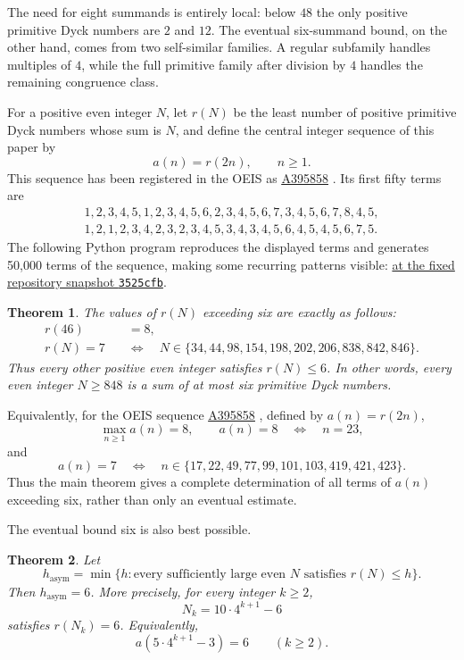 \documentclass[12pt]{article}
\theoremstyle{plain}
\newtheorem{theorem}{Theorem}
\theoremstyle{definition}
\theoremstyle{plain}
\newcommand{\seqnum}[1]{\href{https://oeis.org/#1}{\rm \underline{#1}}}
\begin{document}
The need for eight summands is entirely local: below $48$ the only
positive primitive Dyck numbers are $2$ and $12$.  The eventual
six-summand bound, on the other hand, comes from two self-similar
families.  A regular subfamily handles multiples of $4$, while the full
primitive family after division by $4$ handles the remaining congruence
class.

For a positive even integer $N$, let $r(N)$ be the least number of
positive primitive Dyck numbers whose sum is $N$, and define the central
integer sequence of this paper by
\[
        a(n)=r(2n),\qquad n\geq1.
\]
This sequence has been registered in the OEIS as
\seqnum{A395858} \cite{OEIS-A395858}.  Its first fifty terms are
\[
\begin{gathered}
1,2,3,4,5,1,2,3,4,5,6,2,3,4,5,6,7,3,4,5,6,7,8,4,5,\\
1,2,1,2,3,4,2,3,2,3,4,5,3,4,3,4,5,6,4,5,4,5,6,7,5.
\end{gathered}
\]
The following Python program reproduces the displayed terms and generates
50,000 terms of the sequence, making some recurring patterns visible:
\href{https://github.com/growupkuriyama-hub/lean_cfg_project/blob/3525cfb/LeanCfgProject/PrimDyck/A395858.py}{ at the fixed repository snapshot \texttt{3525cfb}}.

\begin{theorem}\label{thm:classification}
The values of $r(N)$ exceeding six are exactly as follows:
\[
\begin{aligned}
 r(46)&=8,\\[4pt]
 r(N)=7\quad&\Longleftrightarrow\quad
 N\in\{34,44,98,154,198,202,206,838,842,846\}.
\end{aligned}
\]
Thus every other positive even integer satisfies $r(N)\leq6$.  In other
words, every even integer $N\geq848$ is a sum of at most six primitive
Dyck numbers.
\end{theorem}

Equivalently, for the OEIS sequence \seqnum{A395858}
\cite{OEIS-A395858}, defined by $a(n)=r(2n)$,
\[
        \max_{n\geq1}a(n)=8,
        \qquad
        a(n)=8\quad\Longleftrightarrow\quad n=23,
\]
and
\[
 a(n)=7
 \quad\Longleftrightarrow\quad
 n\in\{17,22,49,77,99,101,103,419,421,423\}.
\]
Thus the main theorem gives a complete determination of all terms of
$a(n)$ exceeding six, rather than only an eventual estimate.


The eventual bound six is also best possible.

\begin{theorem}\label{thm:asymptotic-order}
Let
\[
 h_{\mathrm{asym}}
 =\min\{h:\text{every sufficiently large even }N\text{ satisfies }r(N)\leq h\}.
\]
Then $h_{\mathrm{asym}}=6$.  More precisely, for every integer $k\geq2$,
\[
 N_k=10\cdot4^{k+1}-6
\]
satisfies $r(N_k)=6$.  Equivalently,
\[
 a(5\cdot4^{k+1}-3)=6\qquad(k\geq2).
\]
\end{theorem}
\end{document}
